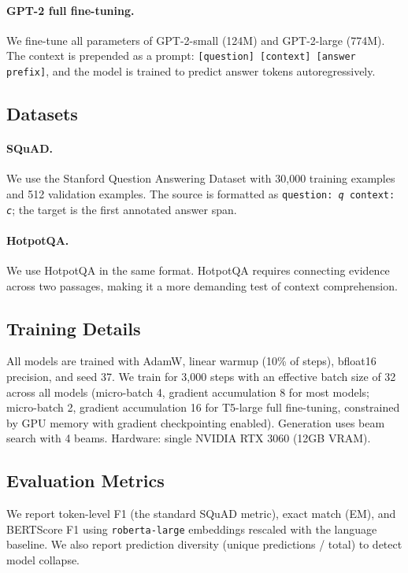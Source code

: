 \documentclass[11pt]{article}
\newcommand{\squad}{SQuAD\xspace}
\newcommand{\hotpotqa}{HotpotQA\xspace}
\begin{document}
\paragraph{GPT-2 full fine-tuning.}
We fine-tune all parameters of GPT-2-small (124M) and GPT-2-large (774M).
The context is prepended as a prompt: \texttt{[question] [context] [answer prefix]},
and the model is trained to predict answer tokens autoregressively.

\subsection{Datasets}

\paragraph{SQuAD.}
We use the Stanford Question Answering Dataset \citep{rajpurkar2016squad}
with 30{,}000 training examples and 512 validation examples.
The source is formatted as \texttt{question: \textit{q} context: \textit{c}};
the target is the first annotated answer span.

\paragraph{HotpotQA.}
We use \hotpotqa \citep{yang2018hotpotqa} in the same format.
HotpotQA requires connecting evidence across two passages,
making it a more demanding test of context comprehension.

\subsection{Training Details}

All models are trained with AdamW, linear warmup (10\% of steps),
bfloat16 precision, and seed 37.
We train for 3{,}000 steps with an effective batch size of 32 across all
models (micro-batch 4, gradient accumulation 8 for most models;
micro-batch 2, gradient accumulation 16 for T5-large full fine-tuning,
constrained by GPU memory with gradient checkpointing enabled).
Generation uses beam search with 4 beams.
Hardware: single NVIDIA RTX 3060 (12GB VRAM).

\subsection{Evaluation Metrics}

We report token-level F1 (the standard \squad metric), exact match (EM),
and BERTScore F1 \citep{zhang2020bertscore} using \texttt{roberta-large}
embeddings rescaled with the language baseline.
We also report prediction diversity (unique predictions / total) to detect
model collapse.
\end{document}
